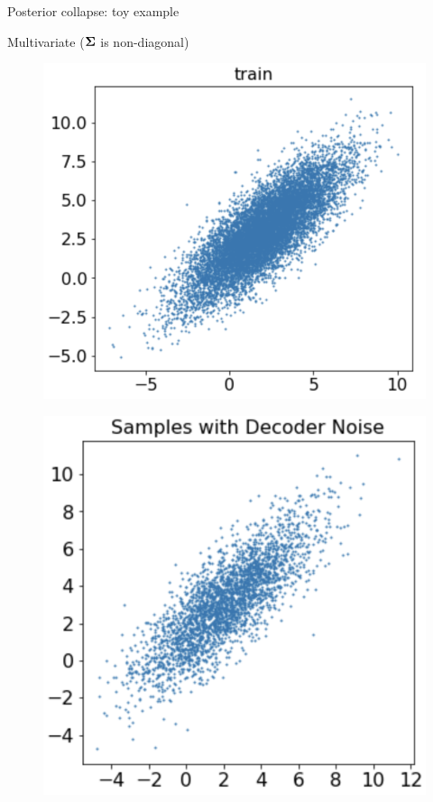 \begin{frame}{Posterior collapse: toy example}
	\begin{block}{Multivariate ($\boldsymbol{\Sigma}$ is non-diagonal)}
		\vspace{-0.5cm}
		\begin{minipage}[t]{0.33\columnwidth}
			\begin{figure}[h]
				\centering
				\includegraphics[width=.8\linewidth]{figs/posterior_collapse_toy_1.png}
			\end{figure}
		\end{minipage}%
		\begin{minipage}[t]{0.33\columnwidth}
			\begin{figure}[h]
				\centering
				\includegraphics[width=0.75\linewidth]{figs/posterior_collapse_toy_3.png}

\end{figure}
\end{minipage}
\end{block}
\end{frame}
